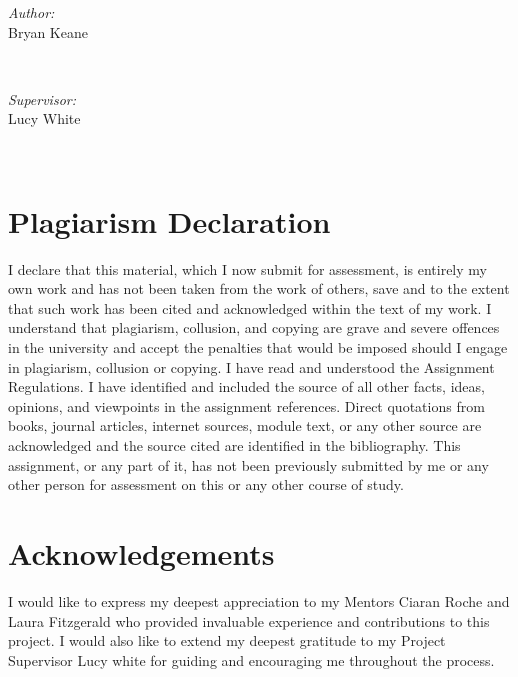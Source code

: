 \documentclass{article}
\begin{document}
\begin{titlepage}
    \begin{minipage}{0.4\textwidth}
    \begin{flushleft} \large
    \emph{Author:}\\
    Bryan Keane 
    \end{flushleft}
    \end{minipage}
    ~
    \begin{minipage}{0.4\textwidth}
    \begin{flushright} \large
    \emph{Supervisor:} \\
    Lucy White
    \end{flushright}
    \end{minipage}\\[2cm]
    
\end{titlepage}

\newpage

\tableofcontents
\newpage

\listoffigures
\newpage

\listoftables
\newpage



\section{Plagiarism Declaration}
I declare that this material, which I now submit for assessment, is entirely my own work and has not been taken from the work of others, save and to the extent that such work has been cited and acknowledged within the text of my work. I understand that plagiarism, collusion, and copying are grave and severe offences in the university and accept the penalties that would be imposed should I engage in plagiarism, collusion or copying. I have read and understood the Assignment Regulations. I have identified and included the source of all other facts, ideas, opinions, and viewpoints in the assignment references. Direct quotations from books, journal articles, internet sources, module text, or any other source are acknowledged and the source cited are identified in the bibliography. This assignment, or any part of it, has not been previously submitted by me or any other person for assessment on this or any other course of study.  



\newpage
\section{Acknowledgements}
I would like to express my deepest appreciation to my Mentors Ciaran Roche and Laura Fitzgerald who provided invaluable experience and contributions to this project. I would also like to extend my deepest gratitude to my Project Supervisor Lucy white for guiding and encouraging me throughout the process.
\end{document}
